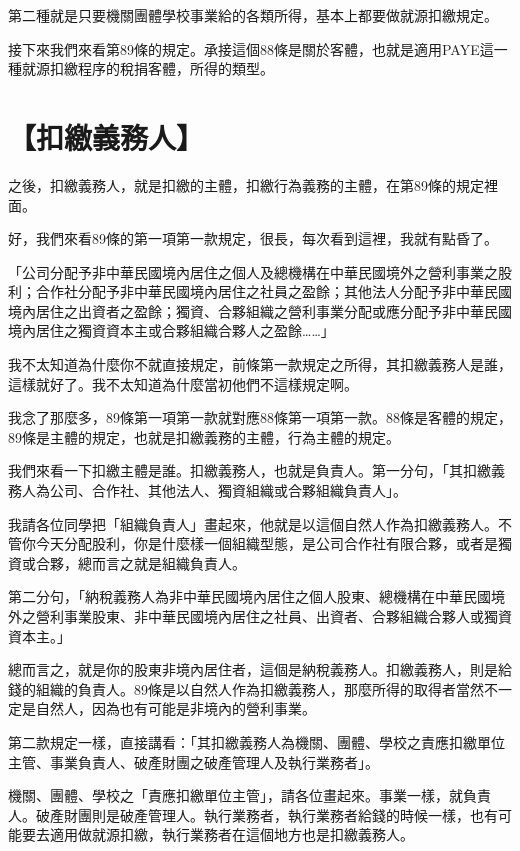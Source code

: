 \documentclass[]{ctexbook}
\begin{document}
第二種就是只要機關團體學校事業給的各類所得，基本上都要做就源扣繳規定。

接下來我們來看第89條的規定。承接這個88條是關於客體，也就是適用PAYE這一種就源扣繳程序的稅捐客體，所得的類型。

\hypertarget{ux6263ux7e73ux7fa9ux52d9ux4eba}{%
\section{【扣繳義務人】}\label{ux6263ux7e73ux7fa9ux52d9ux4eba}}

之後，扣繳義務人，就是扣繳的主體，扣繳行為義務的主體，在第89條的規定裡面。

好，我們來看89條的第一項第一款規定，很長，每次看到這裡，我就有點昏了。

「公司分配予非中華民國境內居住之個人及總機構在中華民國境外之營利事業之股利；合作社分配予非中華民國境內居住之社員之盈餘；其他法人分配予非中華民國境內居住之出資者之盈餘；獨資、合夥組織之營利事業分配或應分配予非中華民國境內居住之獨資資本主或合夥組織合夥人之盈餘\ldots\ldots」

我不太知道為什麼你不就直接規定，前條第一款規定之所得，其扣繳義務人是誰，這樣就好了。我不太知道為什麼當初他們不這樣規定啊。

我念了那麼多，89條第一項第一款就對應88條第一項第一款。88條是客體的規定，89條是主體的規定，也就是扣繳義務的主體，行為主體的規定。

我們來看一下扣繳主體是誰。扣繳義務人，也就是負責人。第一分句，「其扣繳義務人為公司、合作社、其他法人、獨資組織或合夥組織負責人」。

我請各位同學把「組織負責人」畫起來，他就是以這個自然人作為扣繳義務人。不管你今天分配股利，你是什麼樣一個組織型態，是公司合作社有限合夥，或者是獨資或合夥，總而言之就是組織負責人。

第二分句，「納稅義務人為非中華民國境內居住之個人股東、總機構在中華民國境外之營利事業股東、非中華民國境內居住之社員、出資者、合夥組織合夥人或獨資資本主。」

總而言之，就是你的股東非境內居住者，這個是納稅義務人。扣繳義務人，則是給錢的組織的負責人。89條是以自然人作為扣繳義務人，那麼所得的取得者當然不一定是自然人，因為也有可能是非境內的營利事業。

第二款規定一樣，直接講看：「其扣繳義務人為機關、團體、學校之責應扣繳單位主管、事業負責人、破產財團之破產管理人及執行業務者」。

機關、團體、學校之「責應扣繳單位主管」，請各位畫起來。事業一樣，就負責人。破產財團則是破產管理人。執行業務者，執行業務者給錢的時候一樣，也有可能要去適用做就源扣繳，執行業務者在這個地方也是扣繳義務人。
\end{document}
